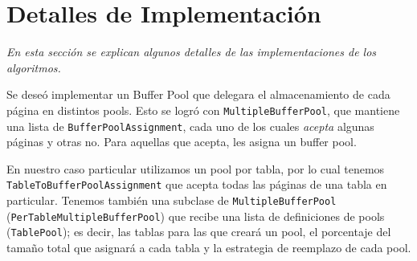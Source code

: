 \section{Detalles de Implementaci\'on}

\textsl{En esta secci\'on se explican algunos detalles de las
implementaciones de los algoritmos.}

\vspace*{0.5cm}

Se dese\'o implementar un Buffer Pool que delegara el almacenamiento 
de cada página en distintos pools. 
Esto se logró con \texttt{MultipleBufferPool}, que mantiene una lista 
de \texttt{BufferPoolAssignment}, cada uno de los cuales 
\textit{acepta} algunas páginas y otras no.
Para aquellas que acepta, les asigna un buffer pool.

\vspace*{0.3cm}

En nuestro caso particular utilizamos un pool por tabla, por lo
cual tenemos \\
\texttt{TableToBufferPoolAssignment} que acepta todas 
las páginas de una tabla en particular.
Tenemos tambi\'en una subclase de \texttt{MultipleBufferPool} 
(\texttt{PerTableMultipleBufferPool}) que recibe una lista de 
definiciones de pools (\texttt{TablePool}); es decir, las 
tablas para las que creará un pool, el porcentaje del tamaño
total que asignará a cada tabla y la estrategia de reemplazo
de cada pool.

